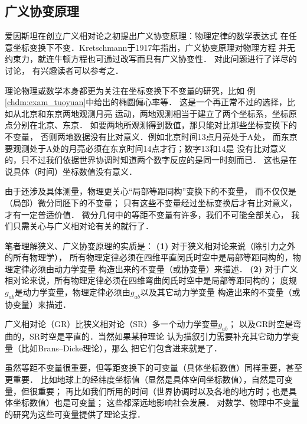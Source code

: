 \subsection{广义协变原理}\label{chfd:sec_general-covariance}
爱因斯坦在创立广义相对论之初提出广义协变原理：物理定律的数学表达式
在任意坐标变换下不变．Kretschmann于1917年指出，广义协变原理对物理方程
并无约束力，就连牛顿方程也可通过改写而具有广义协变性．
\textcite[\S 7.1]{ohanian-ruffini-2013}对此问题进行了详尽的讨论，
有兴趣读者可以参考之．


理论物理或数学本身都更为关注在坐标变换下不变量的研究，比如
例\ref{chdm:exam_tuoyuan}中给出的椭圆偏心率等．
这是一个再正常不过的选择，比如从北京和东京两地观测月亮
运动，两地观测相当于建立了两个坐标系，坐标原点分别在北京、东京．
如要两地所观测得到数值，那只能对比那些坐标变换下的不变量，
否则两地数据没有比对意义．例如北京时间13点月亮处于A处，
而东京要观测处于A处的月亮必须在东京时间14点才行；数字13和14是
没有比对意义的，只不过我们依据世界协调时知道两个数字反应的是同一时刻而已．
这也是在说具体（时间）坐标数值没有意义．

由于还涉及具体测量，物理更关心“局部等距同构”变换下的不变量，
而不仅仅是（局部）微分同胚下的不变量；
只有这些不变量经过坐标变换后才有比对意义，才有一定普适价值．
微分几何中的等距不变量有许多，我们不可能全部关心，
我们只需关心与广义相对论有关的就行了．


笔者理解{\heiti 狭义、广义协变原理}的实质是：
{\bfseries (1)} 对于狭义相对论来说（除引力之外的所有物理学），
所有物理定律必须在四维平直闵氏时空中是局部等距同构的，物理定律必须由动力学变量
构造出来的不变量（或协变量）来描述．
{\bfseries (2)} 对于广义相对论来说，所有物理定律必须在四维弯曲闵氏时空中是局部等距同构的；
度规$g_{ab}$是动力学变量，物理定律必须由$g_{ab}$以及其它动力学变量
构造出来的不变量（或协变量）来描述．



广义相对论（GR）比狭义相对论（SR）多一个动力学变量$g_{ab}$；
以及GR时空是弯曲的，SR时空是平直的．当然如果某种理论
认为描叙引力需要补充其它动力学变量（比如Brans--Dicke理论），那么
把它们包含进来就是了．

虽然等距不变量很重要，但等距变换下的{\kaishu 可变量}（具体坐标数值）同样重要，甚至更重要．
比如地球上的经纬度坐标值（显然是具体空间坐标数值），自然是可变量，但很重要；
再比如我们所用的时间（世界协调时以及各地的地方时；也是具体坐标数值）也是可变量；
这些都深远地影响社会发展．
对数学、物理中不变量的研究为这些可变量提供了理论支撑．



